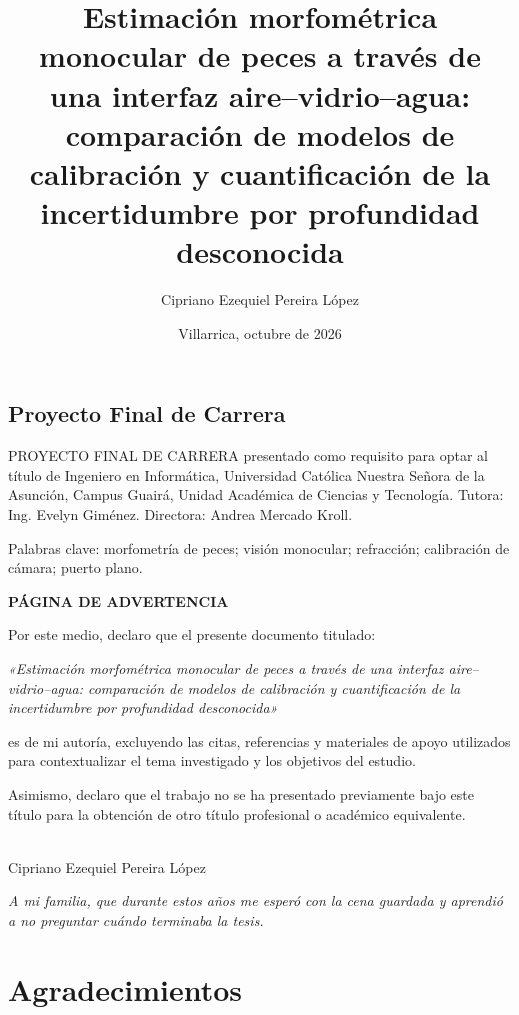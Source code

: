 \documentclass{report}
\newcommand{\Titulo}{Estimación morfométrica monocular de peces a través de una interfaz aire--vidrio--agua: comparación de modelos de calibración y cuantificación de la incertidumbre por profundidad desconocida}
\newcommand{\Autor}{Cipriano Ezequiel Pereira López}
\newcommand{\Tutora}{Ing. Evelyn Giménez}
\newcommand{\Directora}{Andrea Mercado Kroll}
\newcommand{\Universidad}{Universidad Católica Nuestra Señora de la Asunción}
\newcommand{\Campus}{Campus Guairá}
\newcommand{\Unidad}{Unidad Académica de Ciencias y Tecnología}
\newcommand{\Ciudad}{Villarrica}
\newcommand{\Fecha}{octubre de 2026}
\newcommand{\PalabrasClave}{morfometría de peces; visión monocular; refracción; calibración de cámara; puerto plano}
\begin{document}
\title{\Titulo}\author{\Autor}\date{\Ciudad, \Fecha}\maketitle
\section*{Proyecto Final de Carrera}
PROYECTO FINAL DE CARRERA presentado como requisito para optar al título de Ingeniero en Informática, \Universidad, \Campus, \Unidad. Tutora: \Tutora. Directora: \Directora.

Palabras clave: \PalabrasClave.



{\large\bfseries PÁGINA DE ADVERTENCIA\par}

\vspace{1cm}
Por este medio, declaro que el presente documento titulado:

\emph{«\Titulo»}

es de mi autoría, excluyendo las citas, referencias y materiales de apoyo utilizados para contextualizar el tema investigado y los objetivos del estudio.

Asimismo, declaro que el trabajo no se ha presentado previamente bajo este título para la obtención de otro título profesional o académico equivalente.
\vspace{3cm}

\\ \Autor




\vspace*{5cm}


\emph{A mi familia, que durante estos años me esperó con la cena guardada y aprendió a no preguntar cuándo terminaba la tesis.}




\chapter*{Agradecimientos}
\end{document}
